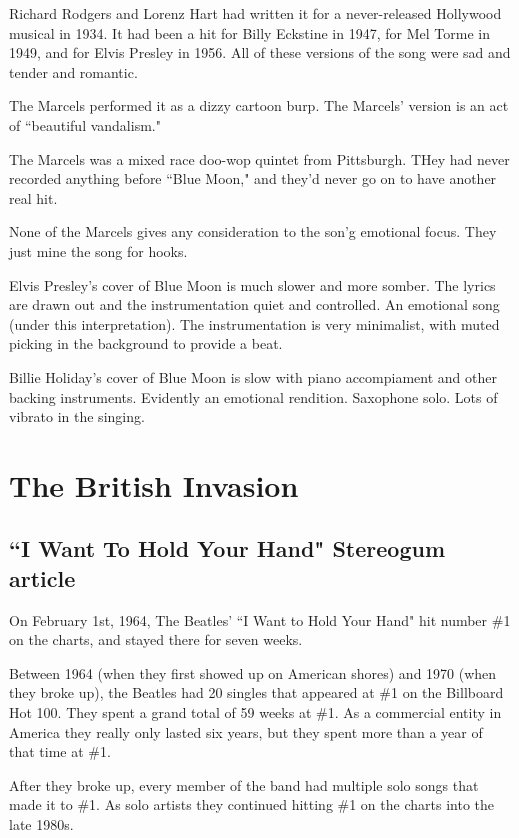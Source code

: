 \documentclass[12pt, a4paper, twoside, openright, titlepage]{book}
\begin{document}
Richard Rodgers and Lorenz Hart had written it for a never-released Hollywood musical in 1934. It had been a hit for Billy Eckstine in 1947, for Mel Torme in 1949, and for Elvis Presley in 1956. All of these versions of the song were sad and tender and romantic.

The Marcels performed it as a dizzy cartoon burp. The Marcels' version is an act of ``beautiful vandalism."

\begin{rmk}{}{}
    The Marcels was a mixed race doo-wop quintet from Pittsburgh. THey had never recorded anything before ``Blue Moon," and they'd never go on to have another real hit.
\end{rmk}

None of the Marcels gives any consideration to the son'g emotional focus. They just mine the song for hooks.


Elvis Presley's cover of Blue Moon is much slower and more somber. The lyrics are drawn out and the instrumentation quiet and controlled. An emotional song (under this interpretation). The instrumentation is very minimalist, with muted picking in the background to provide a beat.


Billie Holiday's cover of Blue Moon is slow with piano accompiament and other backing instruments. Evidently an emotional rendition. Saxophone solo. Lots of vibrato in the singing.





\chapter{The British Invasion}


\section{``I Want To Hold Your Hand" Stereogum article}


On February 1st, 1964, The Beatles' ``I Want to Hold Your Hand" hit number \#1 on the charts, and stayed there for seven weeks.


Between 1964 (when they first showed up on American shores) and 1970 (when they broke up), the Beatles had 20 singles that appeared at \#1 on the Billboard Hot 100. They spent a grand total of 59 weeks at \#1. As a commercial entity in America they really only lasted six years, but they spent more than a year of that time at \#1.

After they broke up, every member of the band had multiple solo songs that made it to \#1. As solo artists they continued hitting \#1 on the charts into the late 1980s.
\end{document}
